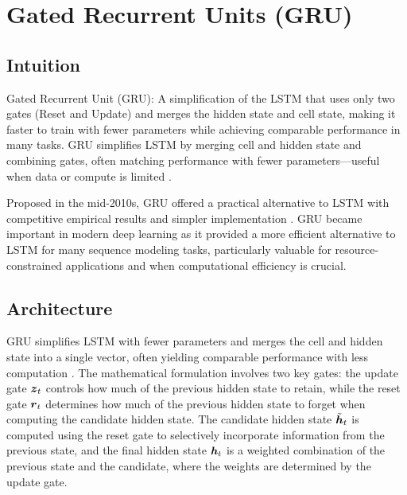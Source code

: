 
\section{Gated Recurrent Units (GRU) }
\label{sec:gru}

\subsection*{Intuition}

Gated Recurrent Unit (GRU): A simplification of the LSTM that uses only two gates (Reset and Update) and merges the hidden state and cell state, making it faster to train with fewer parameters while achieving comparable performance in many tasks. GRU simplifies LSTM by merging cell and hidden state and combining gates, often matching performance with fewer parameters—useful when data or compute is limited \cite{Cho2014,GoodfellowEtAl2016}.

\begin{remark}
Proposed in the mid-2010s, GRU offered a practical alternative to LSTM with competitive empirical results and simpler implementation \cite{Cho2014}. GRU became important in modern deep learning as it provided a more efficient alternative to LSTM for many sequence modeling tasks, particularly valuable for resource-constrained applications and when computational efficiency is crucial.
\end{remark}


\subsection{Architecture}

GRU simplifies LSTM with fewer parameters and merges the cell and hidden state into a single vector, often yielding comparable performance with less computation \cite{Cho2014,GoodfellowEtAl2016}. The mathematical formulation involves two key gates: the update gate $\boldsymbol{z}_t$ controls how much of the previous hidden state to retain, while the reset gate $\boldsymbol{r}_t$ determines how much of the previous hidden state to forget when computing the candidate hidden state. The candidate hidden state $\tilde{\boldsymbol{h}}_t$ is computed using the reset gate to selectively incorporate information from the previous state, and the final hidden state $\boldsymbol{h}_t$ is a weighted combination of the previous state and the candidate, where the weights are determined by the update gate.

